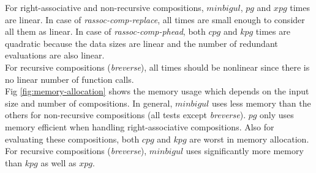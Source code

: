 For right-associative and non-recursive compositions, $minbigul$, $pg$ and $xpg$ times are linear. In case of \textit{rassoc-comp-replace}, all times are small enough to consider all them as linear. In case of \textit{rassoc-comp-phead}, both $cpg$ and $kpg$ times are quadratic because the data sizes are linear and the number of redundant evaluations are also linear.\\

For recursive compositions (\textit{breverse}), all times should be nonlinear since there is no linear number of function calls.\\



Fig \ref{fig:memory-allocation} shows the memory usage which depends on the input size and number of compositions. In general, $minbigul$ uses less memory than the others for non-recursive compositions (all tests except \textit{breverse}). $pg$ only uses memory efficient when handling right-associative compositions. Also for evaluating these  compositions, both $cpg$ and $kpg$ are worst in memory allocation. For recursive compositions (\textit{breverse}), $minbigul$ uses significantly more memory than $kpg$ as well as $xpg$.
